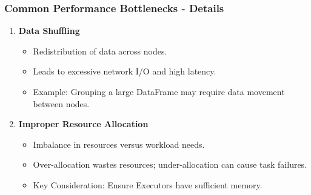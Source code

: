 \documentclass[aspectratio=169]{beamer}
\begin{document}
\begin{frame}[fragile]
    \frametitle{Common Performance Bottlenecks - Details}
    
    \begin{enumerate}
        \item \textbf{Data Shuffling}
            \begin{itemize}
                \item Redistribution of data across nodes.
                \item Leads to excessive network I/O and high latency.
                \item Example: Grouping a large DataFrame may require data movement between nodes.
            \end{itemize}
        
        \item \textbf{Improper Resource Allocation}
            \begin{itemize}
                \item Imbalance in resources versus workload needs.
                \item Over-allocation wastes resources; under-allocation can cause task failures.
                \item Key Consideration: Ensure Executors have sufficient memory.
            \end{itemize}
    \end{enumerate}
\end{frame}
\end{document}
